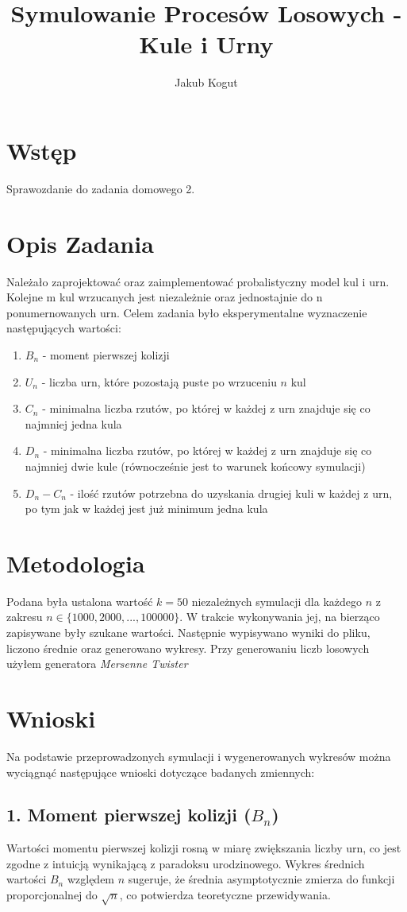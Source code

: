 \documentclass{article}
\title{Symulowanie Procesów Losowych - Kule i Urny}
\author{Jakub Kogut}
\date{}
\begin{document}
\maketitle

\section{Wstęp}
Sprawozdanie do zadania domowego 2.
\section{Opis Zadania}
Należało zaprojektować oraz zaimplementować probalistyczny model kul i urn. Kolejne m kul wrzucanych jest niezależnie oraz jednostajnie do n ponumernowanych urn. Celem zadania było eksperymentalne wyznaczenie następujących wartości:
\begin{enumerate}
    \item $B_n$ - moment pierwszej kolizji
    \item $U_n$ - liczba urn, które pozostają puste po wrzuceniu $n$ kul
    \item $C_n$ - minimalna liczba rzutów, po której w każdej z urn znajduje się co najmniej jedna kula
    \item $D_n$ - minimalna liczba rzutów, po której w każdej z urn znajduje się co najmniej dwie kule (równocześnie jest to warunek końcowy symulacji)
    \item $D_n - C_n$ - ilość rzutów potrzebna do uzyskania drugiej kuli w każdej z urn, po tym jak w każdej jest już minimum jedna kula
\end{enumerate}
\section{Metodologia}
Podana była ustalona wartość $k=50$ niezależnych symulacji dla każdego $n$ z zakresu $n \in \{1000, 2000, ..., 100000\}$. W trakcie wykonywania jej, na bierząco zapisywane były szukane wartości. Następnie wypisywano wyniki do pliku, liczono średnie oraz generowano wykresy.\newline
Przy generowaniu liczb losowych użyłem generatora \textit{Mersenne Twister}
\section{Wnioski}
Na podstawie przeprowadzonych symulacji i wygenerowanych wykresów można wyciągnąć następujące wnioski dotyczące badanych zmiennych:

\subsection*{1. Moment pierwszej kolizji ($B_n$)}
Wartości momentu pierwszej kolizji rosną w miarę zwiększania liczby urn, co jest zgodne z intuicją wynikającą z paradoksu urodzinowego. Wykres średnich wartości $B_n$ względem $n$ sugeruje, że średnia asymptotycznie zmierza do funkcji proporcjonalnej do $\sqrt{n}$, co potwierdza teoretyczne przewidywania.
\end{document}
